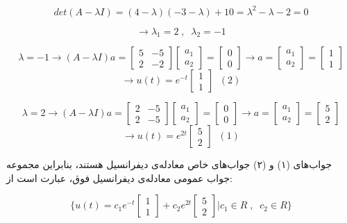 $$det(A-\lambda I) = (4-\lambda)(-3-\lambda)+10 = \lambda^2 -\lambda - 2 = 0$$

$$ \to \lambda_1 = 2 \; , \; \; \lambda_2 = -1 $$

$$ \lambda = -1 \to (A-\lambda I)a = \begin{bmatrix}
5 & -5 \\
2 & -2
\end{bmatrix}
\begin{bmatrix}
a_1 \\
a_2
\end{bmatrix}
=
\begin{bmatrix}
0 \\
0
\end{bmatrix} \to a = \begin{bmatrix}
a_1 \\
a_2
\end{bmatrix} =
\begin{bmatrix}
1 \\
1
\end{bmatrix} $$
$$ \to u(t) = e^{-t} \begin{bmatrix}
1 \\
1
\end{bmatrix} \; \; (2)$$


$$ \lambda = 2 \to (A-\lambda I)a = \begin{bmatrix}
2 & -5 \\
2 & -5
\end{bmatrix}
\begin{bmatrix}
a_1 \\
a_2
\end{bmatrix}
=
\begin{bmatrix}
0 \\
0
\end{bmatrix} \to a = \begin{bmatrix}
a_1 \\
a_2
\end{bmatrix} =
\begin{bmatrix}
5 \\
2
\end{bmatrix} $$
$$ \to u(t) = e^{2t} \begin{bmatrix}
5 \\
2
\end{bmatrix}  \; \; (1)$$

جواب‌های (۱) و (۲) جواب‌های خاص معادله‌ی دیفرانسیل هستند، بنابراین مجموعه جواب عمومی معادله‌ی دیفرانسیل فوق، عبارت است از:

$$ \{ u(t) = c_1 e^{-t} \begin{bmatrix}
1 \\
1
\end{bmatrix} + c_2 e^{2t} \begin{bmatrix}
5 \\
2
\end{bmatrix} \Biggr| c_1 \in R \; , \; \; c_2 \in R \} $$

